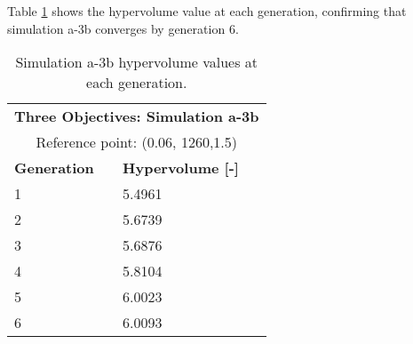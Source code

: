 Table \ref{tab:a3b-hypervolume} shows the hypervolume value at each generation, 
confirming that simulation a-3b converges by generation 6. 
\begin{table}[htbp!]
    \centering
    \onehalfspacing
    \caption{Simulation a-3b hypervolume values at each generation.}
	\label{tab:a3b-hypervolume}
    \footnotesize
    \begin{tabular}{ll}
    \hline 
    \multicolumn{2}{c}{\textbf{Three Objectives: Simulation a-3b}} \\
    \multicolumn{2}{c}{Reference point: (0.06, 1260,1.5)} \\
    \hline 
    \textbf{Generation} & \textbf{Hypervolume [-]} \\
    \hline
    1 & 5.4961 \\
    2 & 5.6739 \\
    3 & 5.6876 \\
    4 & 5.8104 \\
    5 & 6.0023 \\
    6 & 6.0093 \\
    \hline
    \end{tabular}
\end{table}

